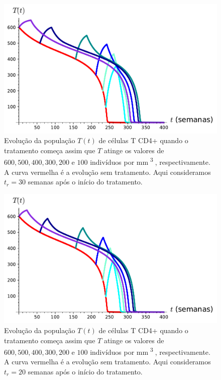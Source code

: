 \begin{figure}[ht!]
    \begin{center}
        \includegraphics[width=.85\textwidth]{./figuras/different_start_tr210.pdf}
    \end{center}
    \caption{Evolução da população \( T ( t ) \) de células T CD4+ quando o tratamento começa assim que \( T \) atinge os valores de \( 600, 500, 400, 300, 200 \) e \( 100 \) indivíduos por \unit{mm^{ 3 }}, respectivamente.
    A curva vermelha é a evolução sem tratamento.
    Aqui consideramos \( t_{ r } = 30 \) semanas após o início do tratamento.}
    \label{fig: multiple_starts_tr30}
\end{figure}

\begin{figure}[ht!]
    \begin{center}
        \includegraphics[width=.85\textwidth]{./figuras/different_start_tr140.pdf}
    \end{center}
    \caption{Evolução da população \( T ( t ) \) de células T CD4+ quando o tratamento começa assim que \( T \) atinge os valores de \( 600, 500, 400, 300, 200 \) e \( 100 \) indivíduos por \unit{mm^{ 3 }}, respectivamente.
    A curva vermelha é a evolução sem tratamento.
    Aqui consideramos \( t_{ r } = 20 \) semanas após o início do tratamento.}
    \label{fig: multiple_starts_tr20}
\end{figure}


